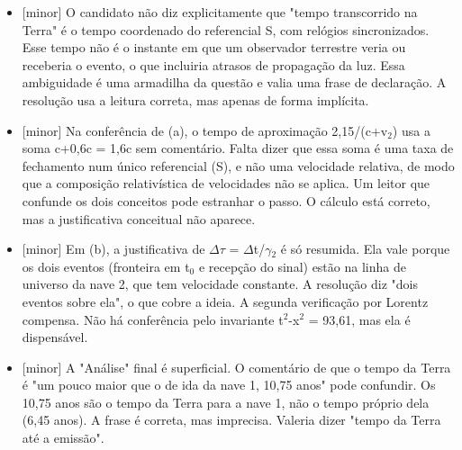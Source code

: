 \documentclass{article}%
\begin{document}
\begin{itemize}%
\item%
{[}minor{]} O candidato não diz explicitamente que "tempo transcorrido na Terra" é o tempo coordenado do referencial S, com relógios sincronizados. Esse tempo não é o instante em que um observador terrestre veria ou receberia o evento, o que incluiria atrasos de propagação da luz. Essa ambiguidade é uma armadilha da questão e valia uma frase de declaração. A resolução usa a leitura correta, mas apenas de forma implícita.%
\item%
{[}minor{]} Na conferência de (a), o tempo de aproximação 2,15/(c+v$_{2}$) usa a soma c+0,6c = 1,6c sem comentário. Falta dizer que essa soma é uma taxa de fechamento num único referencial (S), e não uma velocidade relativa, de modo que a composição relativística de velocidades não se aplica. Um leitor que confunde os dois conceitos pode estranhar o passo. O cálculo está correto, mas a justificativa conceitual não aparece.%
\item%
{[}minor{]} Em (b), a justificativa de $\Delta$$\tau$ = $\Delta$t/$\gamma$$_{2}$ é só resumida. Ela vale porque os dois eventos (fronteira em t$_{0}$ e recepção do sinal) estão na linha de universo da nave 2, que tem velocidade constante. A resolução diz "dois eventos sobre ela", o que cobre a ideia. A segunda verificação por Lorentz compensa. Não há conferência pelo invariante t$^2$-x$^2$ = 93,61, mas ela é dispensável.%
\item%
{[}minor{]} A "Análise" final é superficial. O comentário de que o tempo da Terra é "um pouco maior que o de ida da nave 1, 10,75 anos" pode confundir. Os 10,75 anos são o tempo da Terra para a nave 1, não o tempo próprio dela (6,45 anos). A frase é correta, mas imprecisa. Valeria dizer "tempo da Terra até a emissão".%
\end{itemize}%
\end{document}
